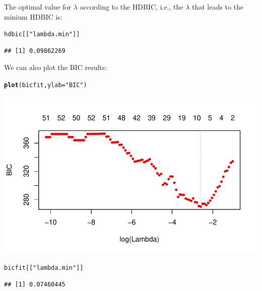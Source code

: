 \documentclass[12pt,letter]{article}\usepackage[]{graphicx}\usepackage[]{color}
\makeatletter
\newcommand{\hlstr}[1]{\textcolor[rgb]{0.192,0.494,0.8}{#1}}%
\newcommand{\hlstd}[1]{\textcolor[rgb]{0.345,0.345,0.345}{#1}}%
\newcommand{\hlkwc}[1]{\textcolor[rgb]{0.333,0.667,0.333}{#1}}%
\newcommand{\hlkwd}[1]{\textcolor[rgb]{0.737,0.353,0.396}{\textbf{#1}}}%
\newenvironment{kframe}{%
 \def\at@end@of@kframe{}%
 \ifinner\ifhmode%
  \def\at@end@of@kframe{\end{minipage}}%
  \begin{minipage}{\columnwidth}%
 \fi\fi%
 \def\FrameCommand##1{\hskip\@totalleftmargin \hskip-\fboxsep
 \colorbox{shadecolor}{##1}\hskip-\fboxsep
     \hskip-\linewidth \hskip-\@totalleftmargin \hskip\columnwidth}%
 \MakeFramed {\advance\hsize-\width
   \@totalleftmargin\z@ \linewidth\hsize
   \@setminipage}}%
 {\par\unskip\endMakeFramed%
 \at@end@of@kframe}
\newenvironment{knitrout}{}{} %
\makeatother
\begin{document}
The optimal value for $\lambda$ according to the HDBIC, i.e., the $\lambda$ that leads to the minium HDBIC is:

\begin{knitrout}\scriptsize
{}\color{fgcolor}\begin{kframe}
\begin{alltt}
\hlstd{hdbic[[}\hlstr{"lambda.min"}\hlstd{]]}
\end{alltt}
\begin{verbatim}
## [1] 0.09862269
\end{verbatim}
\end{kframe}
\end{knitrout}


We can also plot the BIC results:

\begin{knitrout}\scriptsize
{}\color{fgcolor}\begin{kframe}
\begin{alltt}
\hlkwd{plot}\hlstd{(bicfit,} \hlkwc{ylab} \hlstd{=} \hlstr{"BIC"}\hlstd{)}
\end{alltt}
\end{kframe}

{\centering \includegraphics[width=1\linewidth]{figure/ggmix-bic-1} 

}


\begin{kframe}\begin{alltt}
\hlstd{bicfit[[}\hlstr{"lambda.min"}\hlstd{]]}
\end{alltt}
\begin{verbatim}
## [1] 0.07460445
\end{verbatim}
\end{kframe}
\end{knitrout}
\end{document}
